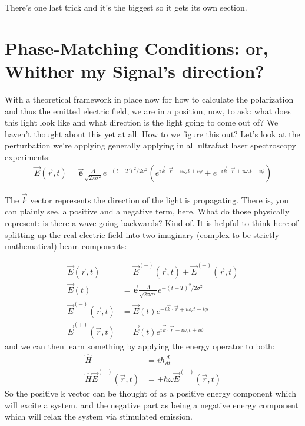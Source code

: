 There's one last trick and it's the biggest so it gets its own section.
\section{Phase-Matching Conditions: or, Whither my Signal's direction?}

With a theoretical framework in place now for how to calculate the polarization and thus the emitted electric field, we are in a position, now, to ask: what does this light look like and what direction is the light going to come out of?  We haven't thought about this yet at all.  How to we figure this out?  Let's look at the perturbation we're applying generally applying in all ultrafast laser spectroscopy experiments:
\begin{align}
	\vec{E}(\vec{r}, t) = \vec{\textbf{e}} \frac{A}{\sqrt{2 \pi \sigma^2}} e^{-(t - T)^2 / 2 \sigma^2} \left( e^{i \vec{k} \cdot \vec{r} - i \omega_c t + i \phi}  + e^{-i \vec{k} \cdot \vec{r} + i \omega_c t - i \phi} \right)
\end{align}

The $\vec{k}$ vector represents the direction of the light is propagating.  There is, you can plainly see, a positive and a negative term, here.  What do those physically represent: is there a wave going backwards?  Kind of.  It is helpful to think here of splitting up the real electric field into two imaginary (complex to be strictly mathematical) beam components:

\begin{align}
	\vec{E}(\vec{r}, t) &= \vec{E}^{(-)}(\vec{r}, t) + \vec{E}^{(+)}(\vec{r}, t)\\
	\vec{E}(t) &= \vec{\textbf{e}} \frac{A}{\sqrt{2 \pi \sigma^2}} e^{-(t - T)^2 / 2 \sigma^2} \\
	\vec{E}^{(-)}(\vec{r}, t) &=  \vec{E}(t) e^{-i \vec{k} \cdot \vec{r} + i \omega_c t - i \phi} \\
	\vec{E}^{(+)}(\vec{r}, t) &=  \vec{E}(t) e^{i \vec{k} \cdot \vec{r} - i \omega_c t + i \phi}
\end{align}
and we can then learn something by applying the energy operator to both:
\begin{align}
	\hat{H} &= i \hbar \frac{d}{dt}\\
	\hat{H}\vec{E}^{(\pm)}(\vec{r}, t) &= \pm \hbar \omega\vec{E}^{(\pm)}(\vec{r}, t)
\end{align}
So the positive k vector can be thought of as a positive energy component which will excite a system, and the negative part as being a negative energy component which will relax the system via stimulated emission.

